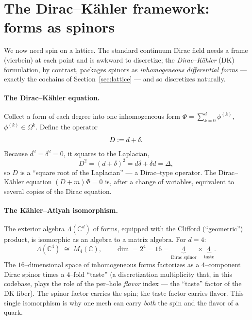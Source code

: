 \documentclass[11pt,oneside]{article}
\newcommand{\C}{\mathbb{C}}
\newcommand{\eqdef}{\vcentcolon=}
\begin{document}
\section{The Dirac--K\"ahler framework: forms as spinors}
\label{sec:dk}

We now need spin on a lattice. The standard continuum Dirac field needs a frame
(vierbein) at each point and is awkward to discretize; the \emph{Dirac--K\"ahler}
(DK) formulation, by contrast, packages spinors as \emph{inhomogeneous
differential forms} --- exactly the cochains of Section~\ref{sec:lattice} ---
and so discretizes naturally.

\paragraph{The Dirac--K\"ahler equation.}
Collect a form of each degree into one inhomogeneous form
$\Phi = \sum_{k=0}^{d}\phi^{(k)}$, $\phi^{(k)}\in\Omega^k$. Define the operator
\begin{equation}
  D \eqdef d + \delta .
\end{equation}
Because $d^2=\delta^2=0$, it squares to the Laplacian,
\begin{equation}
  D^2 = (d+\delta)^2 = d\delta + \delta d = \Delta ,
\end{equation}
so $D$ is a ``square root of the Laplacian'' --- a Dirac--type operator. The
Dirac--K\"ahler equation $(D + m)\Phi = 0$ is, after a change of variables,
equivalent to several copies of the Dirac equation.

\paragraph{The K\"ahler--Atiyah isomorphism.}
The exterior algebra $\Lambda(\C^d)$ of forms, equipped with the Clifford
(``geometric'') product, is isomorphic as an algebra to a matrix algebra. For
$d=4$:
\begin{equation}
  \boxed{\,\Lambda(\C^4) \;\cong\; M_4(\C), \qquad
          \dim = 2^4 = 16 = \underbrace{4}_{\text{Dirac spinor}}
                              \times \underbrace{4}_{\text{taste}}.\,}
  \label{eq:KA}
\end{equation}
The $16$--dimensional space of inhomogeneous forms factorizes as a $4$--component
Dirac spinor times a $4$--fold ``taste'' (a discretization multiplicity that, in
this codebase, plays the role of the per--hole \emph{flavor} index --- the
``taste'' factor of the DK fiber). The spinor factor carries the spin; the taste
factor carries flavor. This single isomorphism is why one mesh can carry
\emph{both} the spin and the flavor of a quark.
\end{document}
